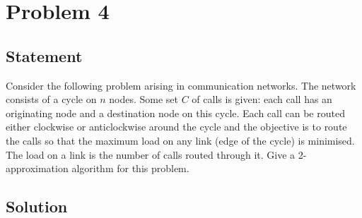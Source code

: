 \documentclass[a4paper]{article}
\begin{document}
\newpage

\section{Problem 4}

\subsection{Statement}
Consider the following problem arising in communication networks.  The network consists of a cycle on $n$ nodes. Some set $C$ of calls is given:  each call has an originating node and a destination node on this cycle.  Each call can be routed either clockwise or anticlockwise around the cycle and the objective is to route the calls so that the maximum load on any link (edge of the cycle) is minimised. The load on a link is the number of calls routed through it. Give a 2-approximation algorithm for this problem.

\subsection{Solution}
\end{document}
